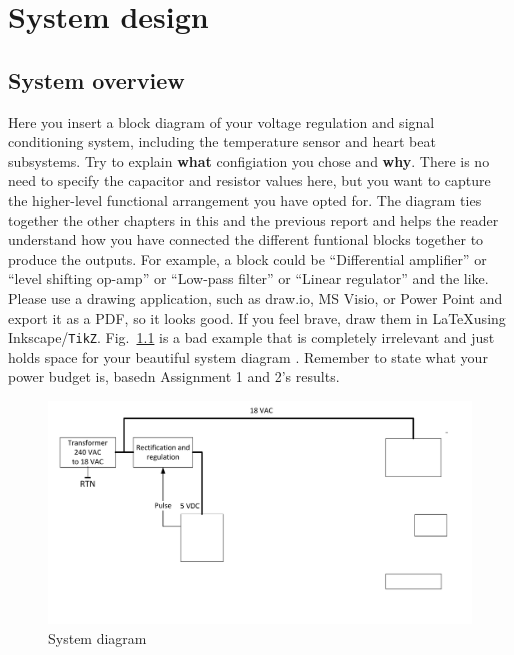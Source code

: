 
\chapter{System design}
\section{System overview} \label{sec:system}
Here you insert a block diagram of your voltage regulation and signal conditioning system, including the temperature sensor and heart beat subsystems. 
Try to explain \textbf{what} configiation you chose and \textbf{why}. 
There is no need to specify the capacitor and resistor values here, but you want to capture the higher-level functional arrangement you have opted for. The diagram ties together the other chapters in this and the previous report and helps the reader understand how you have connected the different funtional blocks together to produce the outputs. For example, a block could be ``Differential amplifier'' or ``level shifting op-amp'' or ``Low-pass filter'' or ``Linear regulator'' and the like. 
Please use a drawing application, such as draw.io, MS Visio, or Power Point and export it as a PDF, so it looks good. If you feel brave, draw them in \LaTeX using Inkscape/\texttt{TikZ}.
Fig.\ \ref{fig:system_diagram} is a bad example that is completely irrelevant and just holds space for your beautiful system diagram \cite{Booysen:2013}.
Remember to state what your power budget is, basedn Assignment 1 and 2's results. 
\begin{figure}[!htb]
    \centering
    \includegraphics[width = 0.5\linewidth]{Figures/PowerSystemDiagram.pdf}
    \caption{System diagram}
    \label{fig:system_diagram}
\end{figure}

\vfill









